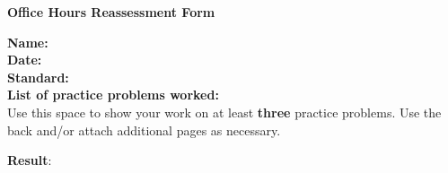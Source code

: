 \documentclass[letterpaper]{article}
\begin{document}
\begin{center}
{\Large \bf Office Hours Reassessment Form} \\
\large \course
\end{center}


	
\vspace{0.2in}

\begin{flushleft}
{\bf Name: } \underline{\phantom{xxxxxxxxxxxxxxxxxxxxxxxxxxxxxxxxxxxxxxxxxxxxxxxxxxxxxxxxx}} \\
\vspace{0.15in}
{\bf Date: } \underline{\phantom{xxxxxxxxxxxxxxxxxxxxxxxxxxxxxxxxxxxxxxxxxxxxxxxxxxxxxxxxx}} \\
\vspace{0.15in}
{\bf Standard: } \underline{\phantom{xxxxxxxxxxxxxxxxxxx}} \\
\vspace{0.15in}
{\bf List of practice problems worked: } \\
\vspace{0.4in}
Use this space to show your work on at least {\bf three} practice problems.  Use the back and/or attach additional pages as necessary.


\end{flushleft}

\vfill

\hfill {\bf Result}: \fbox{\rule{0.5in}{0pt}\rule[-0.5ex]{0pt}{4ex}}
\end{document}
